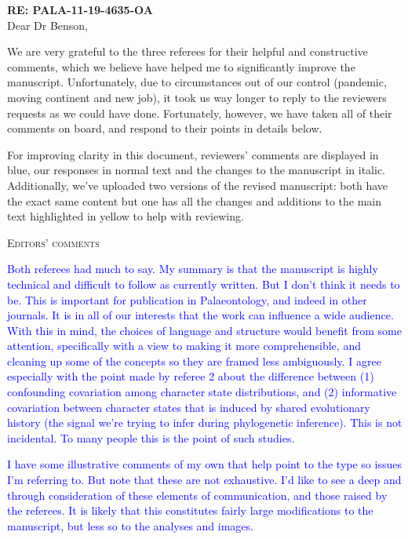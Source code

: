 \documentclass[12pt,letterpaper]{article}
\renewcommand{\section}[1]{%
\bigskip
\begin{center}
\begin{Large}
\normalfont\scshape #1
\medskip
\end{Large}
\end{center}}
\begin{document}
\textbf{RE: PALA-11-19-4635-OA}\\
\bigskip
Dear Dr Benson,\\
\bigskip

We are very grateful to the three referees for their helpful and constructive comments, which we believe have helped me to significantly improve the manuscript.
Unfortunately, due to circumstances out of our control (pandemic, moving continent and new job), it took us way longer to reply to the reviewers requests as we could have done.
Fortunately, however, we have taken all of their comments on board, and respond to their points in details below.

For improving clarity in this document, reviewers' comments are displayed in blue, our responses in normal text and the changes to the manuscript in italic.
Additionally, we've uploaded two versions of the revised manuscript: both have the exact same content but one has all the changes and additions to the main text highlighted in yellow to help with reviewing.


\section{Editors' comments}

\textcolor{blue}{Both referees had much to say. My summary is that the manuscript is highly technical and difficult to follow as currently written. But I don't think it needs to be. This is important for publication in Palaeontology, and indeed in other journals. It is in all of our interests that the work can influence a wide audience. With this in mind, the choices of language and structure would benefit from some attention, specifically with a view to making it more comprehensible, and cleaning up some of the concepts so they are framed less ambiguously. I agree especially with the point made by referee 2 about the difference between (1) confounding covariation among character state distributions, and (2) informative covariation between character states that is induced by shared evolutionary history (the signal we're trying to infer during phylogenetic inference). This is not incidental. To many people this is the point of such studies.}

\textcolor{blue}{I have some illustrative comments of my own that help point to the type so issues I'm referring to. But note that these are not exhaustive. I'd like to see a deep and through consideration of these elements of communication, and those raised by the referees. It is likely that this constitutes fairly large modifications to the manuscript, but less so to the analyses and images.}
\end{document}
